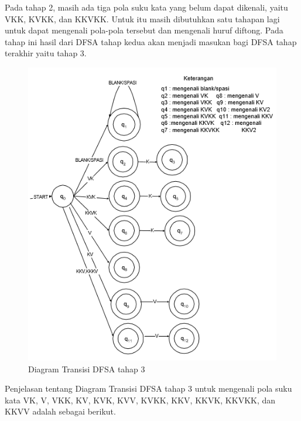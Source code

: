 Pada tahap 2, masih ada tiga pola suku kata yang belum dapat dikenali, yaitu VKK, KVKK, dan KKVKK. Untuk itu masih dibutuhkan satu tahapan lagi untuk dapat mengenali pola-pola tersebut dan mengenali huruf diftong. Pada tahap ini hasil dari DFSA tahap kedua akan menjadi masukan bagi DFSA tahap terakhir yaitu tahap 3.

\begin{figure}[H]
	\centering
	\includegraphics[scale=1]{Gambar/DFSA-3}
	\caption{Diagram Transisi DFSA tahap 3\cite{Thomas:2000}} 
	\label{fig:3-DFSA-3}
\end{figure}

Penjelasan tentang Diagram Transisi DFSA tahap 3 untuk mengenali pola suku kata VK, V, VKK, KV, KVK, KVV, KVKK, KKV, KKVK, KKVKK, dan KKVV adalah sebagai berikut.

